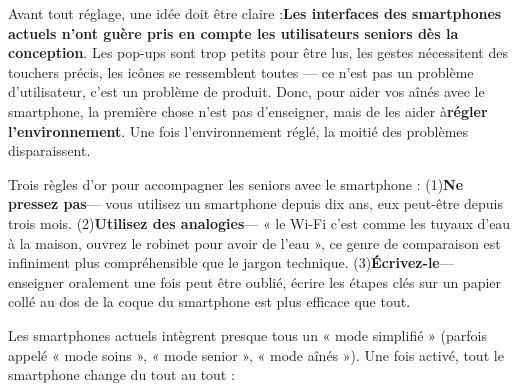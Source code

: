 


Avant tout réglage, une idée doit être claire :\textbf{Les interfaces des smartphones actuels n'ont guère pris en compte les utilisateurs seniors dès la conception}. Les pop-ups sont trop petits pour être lus, les gestes nécessitent des touchers précis, les icônes se ressemblent toutes — ce n'est pas un problème d'utilisateur, c'est un problème de produit. Donc, pour aider vos aînés avec le smartphone, la première chose n'est pas d'enseigner, mais de les aider à\textbf{régler l'environnement}. Une fois l'environnement réglé, la moitié des problèmes disparaissent.

Trois règles d'or pour accompagner les seniors avec le smartphone : (1)\textbf{Ne pressez pas}— vous utilisez un smartphone depuis dix ans, eux peut-être depuis trois mois. (2)\textbf{Utilisez des analogies}— « le Wi-Fi c'est comme les tuyaux d'eau à la maison, ouvrez le robinet pour avoir de l'eau », ce genre de comparaison est infiniment plus compréhensible que le jargon technique. (3)\textbf{Écrivez-le}— enseigner oralement une fois peut être oublié, écrire les étapes clés sur un papier collé au dos de la coque du smartphone est plus efficace que tout.


Les smartphones actuels intègrent presque tous un « mode simplifié » (parfois appelé « mode soins », « mode senior », « mode aînés »). Une fois activé, tout le smartphone change du tout au tout :


